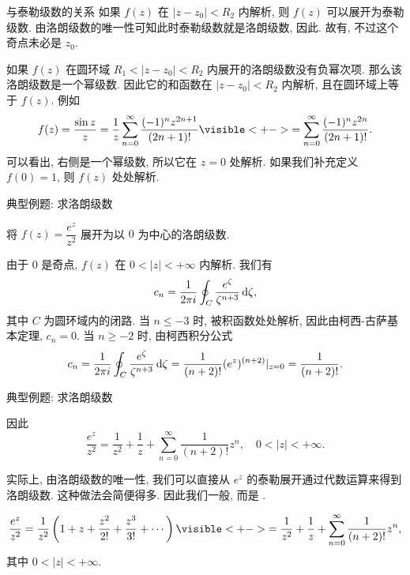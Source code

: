 \begin{frame}{与泰勒级数的关系}
\onslide<+->
如果 $f(z)$ 在 $|z-z_0|<R_2$ 内解析,
\onslide<+->
则 $f(z)$ 可以展开为泰勒级数.
\onslide<+->
由洛朗级数的唯一性可知此时泰勒级数就是洛朗级数,
\onslide<+->
因此.
\onslide<+->
故有, 不过这个奇点未必是 $z_0$.

\onslide<+->
如果 $f(z)$ 在圆环域 $R_1<|z-z_0|<R_2$ 内展开的洛朗级数没有负幂次项.
\onslide<+->
那么该洛朗级数是一个幂级数.
\onslide<+->
因此它的和函数在 $|z-z_0|<R_2$ 内解析, 且在圆环域上等于 $f(z)$.
\onslide<+->
例如
\[f(z)=\frac{\sin z}z=\frac 1z\sum_{n=0}^\infty\frac{(-1)^nz^{2n+1}}{(2n+1)!}
\visible<+->{=\sum_{n=0}^\infty\frac{(-1)^nz^{2n}}{(2n+1)!}.}\]
\onslide<+->
可以看出, 右侧是一个幂级数, 所以它在 $z=0$ 处解析.
\onslide<+->
如果我们补充定义 $f(0)=1$, 则 $f(z)$ 处处解析.
\end{frame}


\begin{frame}{典型例题: 求洛朗级数}
\beqskip{9pt}
\begin{example}
将 $f(z)=\dfrac{e^z}{z^2}$ 展开为以 $0$ 为中心的洛朗级数.
\end{example}
\begin{solution}
由于 $0$ 是奇点, $f(z)$ 在 $0<|z|<+\infty$ 内解析.
\onslide<+->
我们有
\[c_n=\frac1{2\pi i}\oint_C\frac{e^\zeta}{\zeta^{n+3}}\,\mathrm{d}\zeta,\]
其中 $C$ 为圆环域内的闭路.
\onslide<+->
当 $n\le -3$ 时, 被积函数处处解析, 因此由柯西-古萨基本定理, $c_n=0$.
\onslide<+->
当 $n\ge -2$ 时, 由柯西积分公式
\[c_n=\frac1{2\pi i}\oint_C\frac{e^\zeta}{\zeta^{n+3}}\,\mathrm{d}\zeta
=\frac1{(n+2)!}(e^z)^{(n+2)}|_{z=0}=\frac1{(n+2)!}.\]
\end{solution}
\endgroup
\end{frame}


\begin{frame}{典型例题: 求洛朗级数}
\begin{solutionc}
因此
\vspace{-\baselineskip}
\[\frac{e^z}{z^2}=\frac1{z^2}+\frac1z+\sum_{n=0}^\infty \frac1{(n+2)!}z^n,\quad 0<|z|<+\infty.\]
\vspace{-10pt}
\end{solutionc}
\onslide<+->
实际上, 由洛朗级数的唯一性, 我们可以直接从 $e^z$ 的泰勒展开通过代数运算来得到洛朗级数.
\onslide<+->
这种做法会简便得多.
\onslide<+->
因此我们一般, 而是 .
\begin{solution}[另解]
\vspace{-\baselineskip}
\[\frac{e^z}{z^2}=\frac1{z^2}\left(1+z+\frac{z^2}{2!}+\frac{z^3}{3!}+\cdots\right)
\visible<+->{=\frac1{z^2}+\frac1z+\sum_{n=0}^\infty \frac1{(n+2)!}z^n,}\]
其中 $0<|z|<+\infty$.
\end{solution}
\end{frame}


